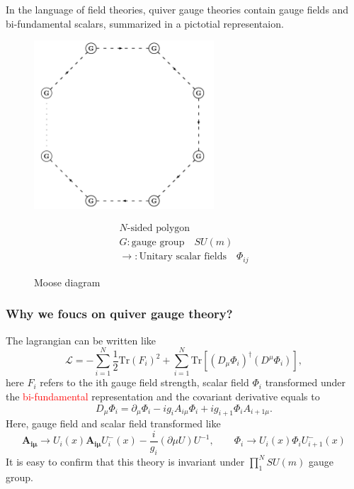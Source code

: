 \documentclass{beamer}
\begin{document}
\begin{frame}
    In the language of field theories, quiver gauge theories contain gauge fields and bi-fundamental scalars, summarized in a pictotial representaion.
    \begin{figure}
        \centering
        \begin{minipage}{0.45\textwidth}
            \centering
            \includegraphics[width=0.6\textwidth]{Moosed.jpeg}
            \caption*{Moose diagram}
        \end{minipage}
        \hspace{1em}
        \begin{minipage}{0.3\textwidth}
            \begin{gather*}
                N\text{-sided polygon}\\
                G: \text{gauge group} \quad SU(m)\\
                \rightarrow : \text{Unitary scalar fields}\quad \Phi_{ij} 
            \end{gather*}
        \end{minipage}
        
    \end{figure}
\end{frame}
\begin{frame}
    \frametitle{Why we foucs on quiver gauge theory?}
    The lagrangian can be written like
    \begin{equation*}
        \mathcal{L}=-\sum_{i=1}^{N}\frac{1}{2}\mathrm{Tr}(F_i)^2+\sum_{i=1}^{N}\mathrm{Tr}[(D_\mu\Phi_i)^\dagger(D^\mu\Phi_i)],
    \end{equation*}
    here $F_i$ refers to the ith gauge field strength, scalar field $\Phi_i$ transformed under the \textcolor{red}{bi-fundamental} representation and the covariant derivative equals to
    \begin{equation*}
        D_\mu \Phi_i=\partial_\mu \Phi_i -ig_iA_{i\mu}\Phi_i+ig_{i+1}\Phi_i A_{i+1\mu}.
    \end{equation*}
    Here, gauge field and scalar field transformed like
    \begin{equation*}
        \bm{A_{i\mu}}\rightarrow U_i(x) \bm{A_{i\mu}} U_i^-(x)-\frac{i}{g_i}(\partial\mu U)U^{-1},\qquad \Phi_i\rightarrow U_i(x)\Phi_i U_{i+1}^-(x)
    \end{equation*}
    It is easy to confirm that this theory is invariant under $\prod_1^N SU(m)$ gauge group.
\end{frame}
\end{document}
